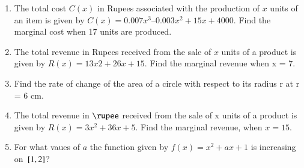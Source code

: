 \begin{enumerate}[label=\arabic*.,ref=\thesubsection.\theenumi]
\item The total cost $C (x)$ in Rupees associated with the production of $x$ units of an item is given by
$C (x) = 0.007x^3 – 0.003x^2 + 15x + 4000$. Find the marginal cost when 17 units are produced.
\item The total revenue in Rupees received from the sale of $x$ units of a product is given by
$R (x) = 13x2 + 26x + 15$.
Find the marginal revenue when x = 7. 
\item Find the rate of change of the area of a circle with respect to its radius r at r = 6 cm.
\item The total revenue in $\rupee$ received from the sale of x units of a product is given by $R(x) = 3x^2+ 36x + 5$. Find the marginal revenue, when $x = 15$.
%
\item For what vaues of $a$ the function given by $f(x) = x^2+ax+1$ is increasing on ${}\left[1,2\right]$?
\end{enumerate}
